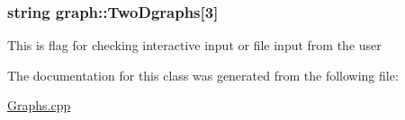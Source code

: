 \subsubsection[{\texorpdfstring{Two\+Dgraphs}{TwoDgraphs}}]{\setlength{\rightskip}{0pt plus 5cm}string graph\+::\+Two\+Dgraphs\mbox{[}3\mbox{]}\hspace{0.3cm}{\ttfamily [static]}}\hypertarget{classgraph_a718228685c9255e4d36f3f3c1294e607}{}\label{classgraph_a718228685c9255e4d36f3f3c1294e607}
This is flag for checking interactive input or file input from the user 

The documentation for this class was generated from the following file\+:\begin{DoxyCompactItemize}
\item 
\hyperlink{Graphs_8cpp}{Graphs.\+cpp}\end{DoxyCompactItemize}
